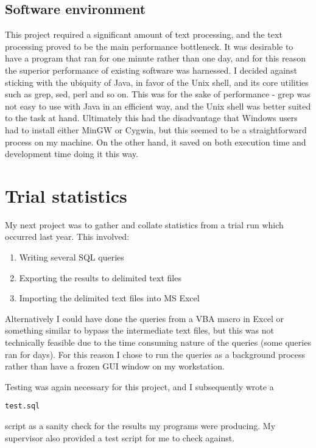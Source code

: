 \documentclass{report}
\begin{document}
\subsection{Software environment}
This project required a significant amount of text processing, and the text processing proved to be the main performance bottleneck. It was desirable to have a program that ran for one minute rather than one day, and for this reason the superior performance of existing software was harnessed. I decided against sticking with the ubiquity of Java, in favor of the Unix shell, and its core utilities such as grep, sed, perl and so on. This was for the sake of performance - grep was not easy to use with Java in an efficient way, and the Unix shell was better suited to the task at hand. Ultimately this had the disadvantage that Windows users had to install either MinGW or Cygwin, but this seemed to be a straightforward process on my machine. On the other hand, it saved on both execution time and development time doing it this way.

\section{Trial statistics}

My next project was to gather and collate statistics from a trial run which occurred last year. This involved:
\begin{enumerate}
  \item Writing several SQL queries
  \item Exporting the results to delimited text files
  \item Importing the delimited text files into MS Excel
\end{enumerate}

Alternatively I could have done the queries from a VBA macro in Excel or something similar to bypass the intermediate text files, but this was not technically feasible due to the time consuming nature of the queries (some queries ran for days). For this reason I chose to run the queries as a background process rather than have a frozen GUI window on my workstation.

Testing was again necessary for this project, and I subsequently wrote a \begin{verbatim}test.sql\end{verbatim} script as a sanity check for the results my programs were producing. My supervisor also provided a test script for me to check against.
\end{document}
